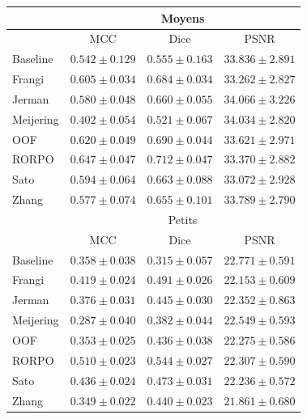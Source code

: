 \begin{table}[H]
\begin{center}
\begin{tabular}{lccc}
            \hline
            & \multicolumn{3}{c}{Moyens}                         \\
            \hline    
            & MCC & Dice & PSNR  \\
            Baseline	& $ 0.542 \pm 0.129 $ & $ 0.555 \pm 0.163 $ & $ 33.836 \pm	2.891 $ \\
            Frangi	& $ 0.605 \pm 0.034 $ & $ 0.684 \pm 0.034 $ & $ 33.262 \pm	2.827 $ \\
            Jerman	& $ 0.580 \pm 0.048 $ & $ 0.660 \pm 0.055 $ & $ 34.066 \pm	3.226 $ \\
            Meijering	& $ 0.402 \pm 0.054 $ & $ 0.521 \pm 0.067 $ & $ 34.034 \pm	2.820 $ \\
            OOF	    & $ 0.620 \pm 0.049 $ & $ 0.690 \pm 0.044 $ & $ 33.621 \pm	2.971 $ \\
            RORPO	    & $ 0.647 \pm 0.047 $ & $ 0.712 \pm 0.047 $ & $ 33.370 \pm	2.882 $ \\
            Sato	    & $ 0.594 \pm 0.064 $ & $ 0.663 \pm 0.088 $ & $ 33.072 \pm	2.928 $ \\
            Zhang	    & $ 0.577 \pm 0.074 $ & $ 0.655 \pm 0.101 $ & $ 33.789 \pm	2.790 $ \\
            \hline
            & \multicolumn{3}{c}{Petits}                          \\
            \hline
            & MCC & Dice & PSNR  \\
            Baseline	    & $ 0.358 \pm 0.038 $ & $ 0.315 \pm 0.057 $ & $ 22.771 \pm	0.591 $ \\
            Frangi	    & $ 0.419 \pm 0.024 $ & $ 0.491 \pm 0.026 $ & $ 22.153 \pm	0.609 $ \\
            Jerman  	    & $ 0.376 \pm 0.031 $ & $ 0.445 \pm 0.030 $ & $ 22.352 \pm	0.863 $ \\
            Meijering	    & $ 0.287 \pm 0.040 $ & $ 0.382 \pm 0.044 $ & $ 22.549 \pm	0.593 $ \\
            OOF	        & $ 0.353 \pm 0.025 $ & $ 0.436 \pm 0.038 $ & $ 22.275 \pm	0.586 $ \\
            RORPO	        & $ 0.510 \pm 0.023 $ & $ 0.544 \pm 0.027 $ & $ 22.307 \pm	0.590 $ \\
            Sato	        & $ 0.436 \pm 0.024 $ & $ 0.473 \pm 0.031 $ & $ 22.236 \pm	0.572 $ \\
            Zhang	        & $ 0.349 \pm 0.022 $ & $ 0.440 \pm 0.023 $ & $ 21.861 \pm	0.680 $ \\
  \hline
  \end{tabular}
  \end{center}
\end{table}

